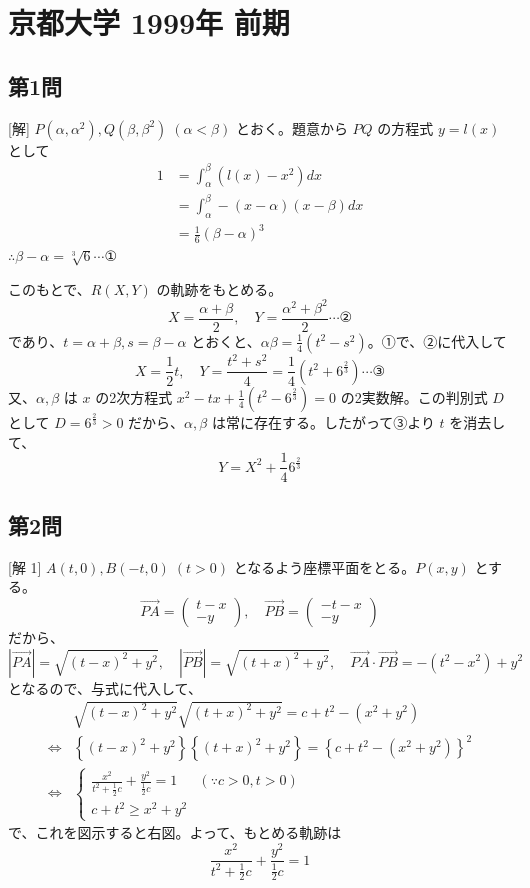 \documentclass[../main.tex]{subfiles}
\begin{document}
\section*{京都大学 1999年 前期}

\subsection*{第1問}
[解] $P(\alpha, \alpha^2), Q(\beta, \beta^2) \; (\alpha < \beta)$ とおく。題意から $PQ$ の方程式 $y = l(x)$ として
\begin{align*}
  1 &= \int_{\alpha}^{\beta} (l(x) - x^2) dx \\
  &= \int_{\alpha}^{\beta} -(x - \alpha)(x - \beta) dx \\
  &= \frac{1}{6} (\beta - \alpha)^3
\end{align*}
$\therefore \beta - \alpha = \sqrt[3]{6} \cdots \text{①}$

このもとで、$R(X, Y)$ の軌跡をもとめる。
$$ X = \frac{\alpha + \beta}{2} , \quad Y = \frac{\alpha^2 + \beta^2}{2} \cdots \text{②} $$
であり、$t = \alpha + \beta, s = \beta - \alpha$ とおくと、$\alpha \beta = \frac{1}{4} (t^2 - s^2)$。①で、②に代入して
$$ X = \frac{1}{2} t , \quad Y = \frac{t^2 + s^2}{4} = \frac{1}{4} \left( t^2 + 6^{\frac{2}{3}} \right) \cdots \text{③} $$
又、$\alpha, \beta$ は $x$ の2次方程式 $x^2 - tx + \frac{1}{4}(t^2 - 6^{\frac{2}{3}}) = 0$ の2実数解。この判別式 $D$ として $D = 6^{\frac{2}{3}} > 0$ だから、$\alpha, \beta$ は常に存在する。したがって③より $t$ を消去して、
$$ Y = X^2 + \frac{1}{4} 6^{\frac{2}{3}} $$

\subsection*{第2問}
[解 1] $A(t, 0), B(-t, 0) \; (t > 0)$ となるよう座標平面をとる。$P(x, y)$ とする。
$$ \overrightarrow{PA} =
\begin{pmatrix} t - x \\ -y
\end{pmatrix}, \quad \overrightarrow{PB} =
\begin{pmatrix} -t - x \\ -y
\end{pmatrix} $$
だから、
$$ |\overrightarrow{PA}| = \sqrt{(t - x)^2 + y^2}, \quad |\overrightarrow{PB}| = \sqrt{(t + x)^2 + y^2}, \quad \overrightarrow{PA} \cdot \overrightarrow{PB} = -(t^2 - x^2) + y^2 $$
となるので、与式に代入して、
\begin{align*}
  & \sqrt{(t - x)^2 + y^2} \sqrt{(t + x)^2 + y^2} = c + t^2 - (x^2 + y^2) \\
  \iff & \left\{ (t - x)^2 + y^2 \right\} \left\{ (t + x)^2 + y^2 \right\} = \left\{ c + t^2 - (x^2 + y^2) \right\}^2 \\
  \iff &
  \begin{cases} \frac{x^2}{t^2 + \frac{1}{2} c} + \frac{y^2}{\frac{1}{2} c} = 1 & (\because c > 0, t > 0) \\ c + t^2 \ge x^2 + y^2
  \end{cases}
\end{align*}
で、これを図示すると右図。よって、もとめる軌跡は
$$ \frac{x^2}{t^2 + \frac{1}{2} c} + \frac{y^2}{\frac{1}{2} c} = 1 $$
\end{document}

